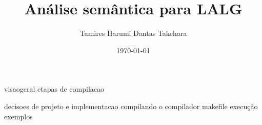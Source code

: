 \documentclass[a4paper]{article}
\title{Análise semântica para LALG}
\author{Tamires Harumi Dantas Takehara}
\date{\today}
\begin{document}
	\maketitle
	
	visaogeral
		etapas de compilacao
	
	decisoes de projeto e implementacao
	compilando o compilador
		makefile
		execução
		exemplos
\end{document}
